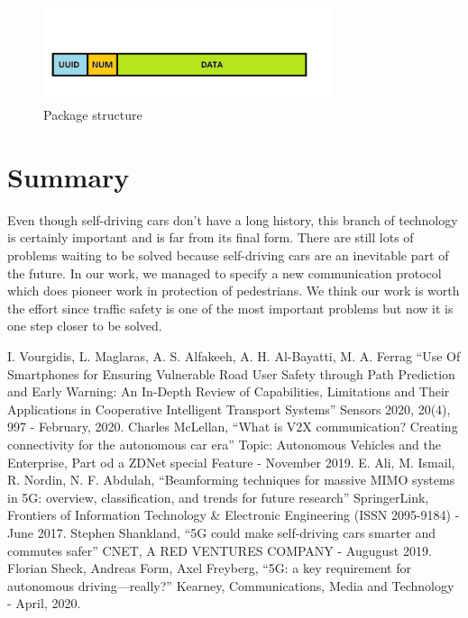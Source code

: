 \documentclass[conference]{IEEEtran}
\begin{document}
\begin{figure}[h]
    \centering
    \includegraphics[width=8.5cm]{./pics/Package structure.png}
    \caption{Package structure}
\end{figure}

\section{Summary}
Even though self-driving cars don't have a long history, this branch of technology is certainly important and is far from its final form. There are still lots of problems waiting to be solved because self-driving cars are an inevitable part of the future. In our work, we managed to specify a new communication protocol which does pioneer work in protection of pedestrians. We think our work is worth the effort since traffic safety is one of the most important problems but now it is one step closer to be solved.

\begin{thebibliography}{00}
     I. Vourgidis, L. Maglaras, A. S. Alfakeeh, A. H. Al-Bayatti, M. A. Ferrag ``Use Of Smartphones for Ensuring Vulnerable Road User Safety through Path Prediction and Early Warning: An In-Depth Review of Capabilities, Limitations and Their Applications in Cooperative Intelligent Transport Systems'' Sensors 2020, 20(4), 997 - February, 2020.
     Charles McLellan, ``What is V2X communication? Creating connectivity for the autonomous car era'' Topic: Autonomous Vehicles and the Enterprise, Part od a ZDNet special Feature - November 2019.
     E. Ali, M. Ismail, R. Nordin, N. F. Abdulah, ``Beamforming techniques for massive MIMO systems in 5G: overview, classification, and trends for future research'' SpringerLink, Frontiers of Information Technology \& Electronic Engineering  (ISSN 2095-9184) - June 2017.
     Stephen Shankland, ``5G could make self-driving cars smarter and commutes safer'' CNET, A RED VENTURES COMPANY - Augugust 2019.
     Florian Sheck, Andreas Form, Axel Freyberg, ``5G: a key requirement for autonomous driving—really?'' Kearney, Communications, Media and Technology - April, 2020.
\end{thebibliography}
\vspace{12pt}
\end{document}

